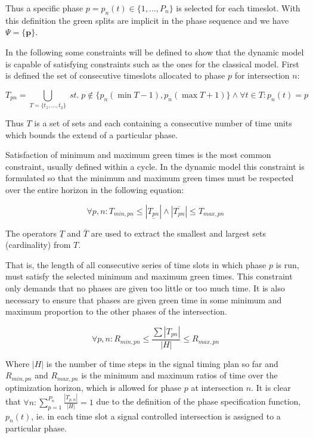 Thus a specific phase $p = p_n(t) \in \lbrace 1,...,P_n \rbrace$ is selected for each timeslot. With this definition the green splits are implicit in the phase sequence and we have $\Psi = \lbrace \textbf{p} \rbrace $.

In the following some constraints will be defined to show that the dynamic model is capable of satisfying constraints such as the ones for the classical model. First is defined the set of consecutive timeslots allocated to phase $p$ for intersection $n$:

\begin{equation}
T_{pn} = \bigcup_{T = \lbrace t_1,...,t_2 \rbrace} \; st. \; p \not \in \lbrace p_n(\min T - 1), p_n(\max T + 1) \rbrace \wedge\forall t \in T: p_n(t) = p 
\end{equation}

Thus $T$ is a set of sets and each containing a consecutive number of time units which bounds the extend of a particular phase.

Satisfaction of minimum and maximum green times is the most common constraint, usually defined within a cycle. In the dynamic model this constraint is formulated so that the minimum and maximum green times must be respected over the entire horizon in the following equation:

\begin{equation}
\label{eqn:minmaxtimes}
\forall p,n : T_{min,pn} \leq |\underline{T_{pn}}| \wedge |\overline{T_{pn}}| \leq T_{max,pn} 
\end{equation}

The operators $\underline{T}$ and $\overline{T}$ are used to extract the smallest and largest sets (cardinality) from $T$.

That is, the length of all consecutive series of time slots in which phase $p$ is run, must satisfy the selected minimum and maximum green times. This constraint only demands that no phases are given too little or too much time. It is also necessary to ensure that phases are given green time in some minimum and maximum proportion to the other phases of the intersection.

\begin{equation}
\label{eqn:proportions}
\forall p,n : R_{min,pn} \leq \frac{\sum |T_{pn}|}{|H|} \leq R_{max,pn}
\end{equation}

Where $|H|$ is the number of time steps in the signal timing plan so far and $R_{min,pn}$ and $R_{max,pn}$ is the minimum and maximum ratios of time over the optimization horizon, which is allowed for phase $p$ at intersection $n$. It is clear that $\forall n : \displaystyle\sum_{p=1}^{P_n}\frac{|T_{p,n}|}{|H|} = 1$ due to the definition of the phase specification function, $p_n(t)$,  ie. in each time slot a signal controlled intersection is assigned to a particular phase.

